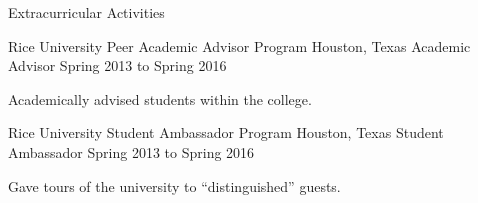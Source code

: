 \documentclass{resume}
\begin{document}
\begin{rSection}{Extracurricular Activities}
{    \begin{rSubSection}
    {Rice University Peer Academic Advisor Program}
    {Houston, Texas}
    {Academic Advisor}
    {Spring 2013 to Spring 2016}%
    \item Academically advised students within the college.
    \end{rSubSection}

    \begin{rSubSection}
    {Rice University Student Ambassador Program}
    {Houston, Texas}
    {Student Ambassador}
    {Spring 2013 to Spring 2016}%
    \item Gave tours of the university to ``distinguished'' guests.
    \end{rSubSection}

  }{}

\end{rSection}
\end{document}
